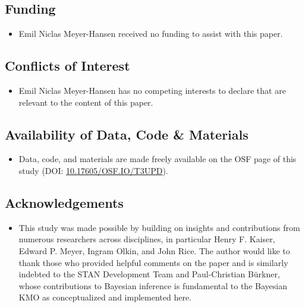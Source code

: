 \documentclass[
  10pt,
  a4paper,
  twoside]{article}
\providecommand{\tightlist}{%
  \setlength{\itemsep}{0pt}\setlength{\parskip}{0pt}}
\begin{document}
\subsection{Funding}\label{funding}

\begin{itemize}
\tightlist
\item
  Emil Niclas Meyer-Hansen received no funding to assist with this paper.
\end{itemize}

\subsection{Conflicts of Interest}\label{conflicts-of-interest}

\begin{itemize}
\tightlist
\item
  Emil Niclas Meyer-Hansen has no competing interests to declare that are relevant to the content of this paper.
\end{itemize}

\subsection{Availability of Data, Code \& Materials}\label{availability-of-data-code-materials}

\begin{itemize}
\tightlist
\item
  Data, code, and materials are made freely available on the OSF page of this study (DOI: \href{https://doi.org/10.17605/OSF.IO/T3UPD}{10.17605/OSF.IO/T3UPD}).
\end{itemize}

\subsection{Acknowledgements}\label{acknowledgements}

\begin{itemize}
\tightlist
\item
  This study was made possible by building on insights and contributions from numerous researchers across disciplines, in particular Henry F. Kaiser, Edward P. Meyer, Ingram Olkin, and John Rice. The author would like to thank those who provided helpful comments on the paper and is similarly indebted to the STAN Development Team and Paul-Christian Bürkner, whose contributions to Bayesian inference is fundamental to the Bayesian KMO as conceptualized and implemented here.
\end{itemize}
\end{document}
